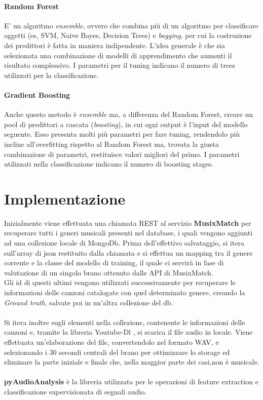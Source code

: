 \documentclass[%
 reprint,
 amsmath,amssymb,
 aps,
 article,
]{revtex4-1}
\begin{document}
\paragraph{Random Forest}

E' un algoritmo \textit{ensemble}, ovvero che combina più di un algoritmo per classificare oggetti (es, SVM, Naive Bayes, Decision Trees) e  \textit{bagging}, per cui la costruzione dei predittori è fatta in maniera indipendente.
L'idea generale è che sia selezionata una combinazione di modelli di apprendimento che aumenti il risultato complessivo. I parametri per il tuning indicano il numero di trees utilizzati per la classificazione.

\paragraph{Gradient Boosting}
Anche questo metodo è \textit{ensemble} ma, a differenza del Random Forest, creare un pool di predittori a cascata (\textit{boosting}), in cui ogni output è l'input del modello seguente. Esso presenta molti più parametri per fare tuning, rendendolo più incline all'overfitting rispetto al Random Forest ma, trovata la giusta combinazione di parametri, restituisce valori migliori del primo. I parametri utilizzati nella classificazione indicano il numero di boosting stages.


\section{\label{sec:level1}Implementazione}

Inizialmente viene effettuata una chiamata REST  \cite {musixmatch} al servizio \textbf{MusixMatch} per recuperare tutti i generi musicali presenti nel database, i quali vengono aggiunti ad una collezione locale di MongoDb. Prima dell'effettivo salvataggio, si itera sull'array di json restituito dalla chiamata e si effettua un mapping tra il genere corrente e la classe del modello di training, il quale ci servirà in fase di valutazione di un singolo brano ottenuto dalle API di MusixMatch.\\
Gli id di questi ultimi vengono utilizzati successivamente per recuperare le informazioni delle canzoni catalogate con quel determinato genere, creando la \textit{Ground truth}, salvate poi in un'altra collezione del db.\\\\
Si itera inoltre sugli elementi nella collezione, contenente le informazioni delle canzoni e, tramite la libreria Youtube-Dl \cite {ytdl}, si scarica il file audio in locale. Viene effettuata un'elaborazione del file, convertendolo nel formato WAV, e selezionando i 30 secondi centrali del brano per ottimizzare lo storage ed eliminare la parte iniziale e finale che, nella maggior parte dei casi,non è musicale.\\\\
\textbf{pyAudioAnalysis} \cite {pyAudioAnalysis} è la libreria utilizzata per le operazioni di feature extraction e classificazione supervisionata di segnali audio.
\end{document}
